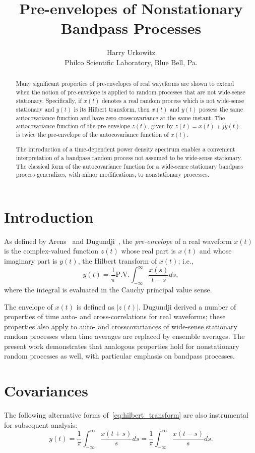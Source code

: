 \documentclass[12pt]{article}
\title{Pre-envelopes of Nonstationary Bandpass Processes}
\author{Harry Urkowitz\\
Philco Scientific Laboratory, Blue Bell, Pa.}
\date{}
\begin{document}
\maketitle

\begin{abstract}
Many significant properties of pre-envelopes of real waveforms are shown to extend when the notion of pre-envelope is applied to random processes that are not wide-sense stationary. Specifically, if $x(t)$ denotes a real random process which is not wide-sense stationary and $y(t)$ is its Hilbert transform, then $x(t)$ and $y(t)$ possess the same autocovariance function and have zero crosscovariance at the same instant. The autocovariance function of the pre-envelope $z(t)$, given by $z(t) = x(t) + jy(t)$, is twice the pre-envelope of the autocovariance function of $x(t)$.

The introduction of a time-dependent power density spectrum enables a convenient interpretation of a bandpass random process not assumed to be wide-sense stationary. The classical form of the autocovariance function for a wide-sense stationary bandpass process generalizes, with minor modifications, to nonstationary processes.
\end{abstract}

\section{Introduction}
As defined by Arens~\cite{arens1957} and Dugundji~\cite{dugundji1958}, the \emph{pre-envelope} of a real waveform $x(t)$ is the complex-valued function $z(t)$ whose real part is $x(t)$ and whose imaginary part is $y(t)$, the Hilbert transform of $x(t)$; i.e.,
\begin{equation}
y(t) = \frac{1}{\pi} \mathrm{P.V.} \int_{-\infty}^{\infty} \frac{x(s)}{t-s} ds,
\label{eq:hilbert_transform}
\end{equation}
where the integral is evaluated in the Cauchy principal value sense.

The envelope of $x(t)$ is defined as $|z(t)|$. Dugundji derived a number of properties of time auto- and cross-correlations for real waveforms; these properties also apply to auto- and crosscovariances of wide-sense stationary random processes when time averages are replaced by ensemble averages. The present work demonstrates that analogous properties hold for nonstationary random processes as well, with particular emphasis on bandpass processes.

\section{Covariances}
The following alternative forms of~\eqref{eq:hilbert_transform} are also instrumental for subsequent analysis:
\begin{equation}
y(t) = \frac{1}{\pi} \int_{-\infty}^{\infty} \frac{x(t+s)}{s} ds = \frac{1}{\pi} \int_{-\infty}^{\infty} \frac{x(t-s)}{s} ds.
\label{eq:hilbert_transform_alt}
\end{equation}
\end{document}
